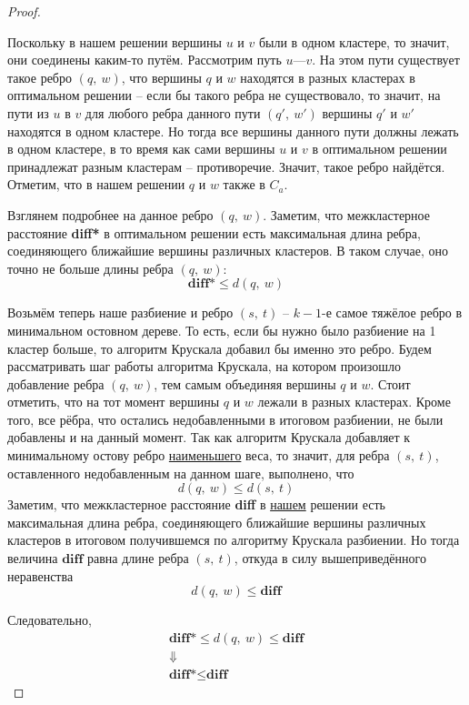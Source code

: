\documentclass[a4paper,12pt]{article}
\begin{document}
\begin{proof}
\begin{center}
\begin{tikzpicture}
\end{tikzpicture}
\end{center}

Поскольку в нашем решении вершины $u$ и $v$ были в одном кластере, то значит, они соединены каким-то путём. Рассмотрим путь $u$---$v$. На этом пути существует такое ребро $(q,\ w)$, что вершины $q$ и $w$ находятся в разных кластерах в оптимальном решении -- если бы такого ребра не существовало, то значит, на пути из $u$ в $v$ для любого ребра данного пути $(q',\ w')$ вершины $q'$ и $w'$ находятся в одном кластере. Но тогда все вершины данного пути должны лежать в одном кластере, в то время как сами вершины $u$ и $v$ в оптимальном решении принадлежат разным кластерам -- противоречие. Значит, такое ребро найдётся. Отметим, что в нашем решении $q$ и $w$ также в $C_a$.

Взглянем подробнее на данное ребро $(q,\ w)$. Заметим, что межкластерное расстояние \textbf{diff*} в оптимальном решении есть максимальная длина ребра, соединяющего ближайшие вершины различных кластеров. В таком случае, оно точно не больше длины ребра $(q,\ w)$: \[\textbf{diff*} \leqslant d(q,\ w)\]

Возьмём теперь наше разбиение и ребро $(s,\ t)$ -- $k - 1$-е самое тяжёлое ребро в минимальном остовном дереве. То есть, если бы нужно было разбиение на 1 кластер больше, то алгоритм Крускала добавил бы именно это ребро. Будем рассматривать шаг работы алгоритма Крускала, на котором произошло добавление ребра $(q,\ w)$, тем самым объединяя вершины $q$ и $w$. Стоит отметить, что на тот момент вершины $q$ и $w$ лежали в разных кластерах. Кроме того, все рёбра, что остались недобавленными в итоговом разбиении, не были добавлены и на данный момент. Так как алгоритм Крускала добавляет к минимальному остову ребро \underline{наименьшего} веса, то значит, для ребра $(s,\ t)$, оставленного недобавленным на данном шаге, выполнено, что 
\[d(q,\ w)  \leqslant d(s,\ t)\] 
Заметим, что межкластерное расстояние \textbf{diff} в \underline{нашем} решении есть максимальная длина ребра, соединяющего ближайшие вершины различных кластеров в итоговом получившемся по алгоритму Крускала разбиении. Но тогда величина $\textbf{diff}$ равна длине ребра $(s,\ t)$, откуда в силу вышеприведённого неравенства
\[d(q,\ w)  \leqslant \textbf{diff}\]

Следовательно,
\begin{gather*}
    \textbf{diff*} \leqslant d(q,\ w)  \leqslant \textbf{diff} \\ \Downarrow \\
    \textbf{diff*}  \leqslant \textbf{diff}
\end{gather*}


\end{proof}
\end{document}
